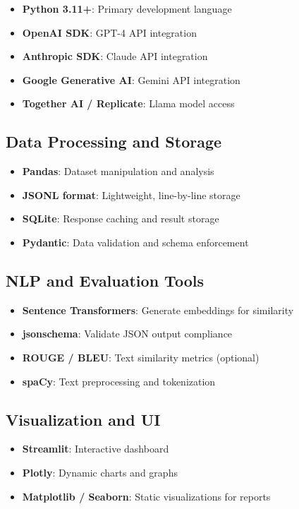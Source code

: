 \documentclass[11pt,a4paper]{article}
\begin{document}
\begin{itemize}[leftmargin=*]
    \item \textbf{Python 3.11+}: Primary development language
    \item \textbf{OpenAI SDK}: GPT-4 API integration
    \item \textbf{Anthropic SDK}: Claude API integration
    \item \textbf{Google Generative AI}: Gemini API integration
    \item \textbf{Together AI / Replicate}: Llama model access
\end{itemize}

\subsection{Data Processing and Storage}

\begin{itemize}[leftmargin=*]
    \item \textbf{Pandas}: Dataset manipulation and analysis
    \item \textbf{JSONL format}: Lightweight, line-by-line storage
    \item \textbf{SQLite}: Response caching and result storage
    \item \textbf{Pydantic}: Data validation and schema enforcement
\end{itemize}

\subsection{NLP and Evaluation Tools}

\begin{itemize}[leftmargin=*]
    \item \textbf{Sentence Transformers}: Generate embeddings for similarity
    \item \textbf{jsonschema}: Validate JSON output compliance
    \item \textbf{ROUGE / BLEU}: Text similarity metrics (optional)
    \item \textbf{spaCy}: Text preprocessing and tokenization
\end{itemize}

\subsection{Visualization and UI}

\begin{itemize}[leftmargin=*]
    \item \textbf{Streamlit}: Interactive dashboard
    \item \textbf{Plotly}: Dynamic charts and graphs
    \item \textbf{Matplotlib / Seaborn}: Static visualizations for reports
\end{itemize}
\end{document}
